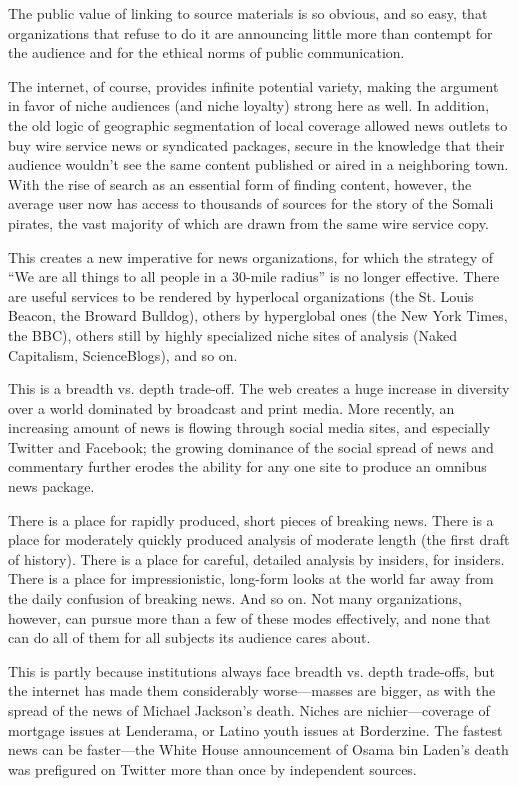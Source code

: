 The public value of linking to source materials is so obvious, and
so easy, that organizations that refuse to do it are announcing little
more than contempt for the audience and for the ethical norms of
public communication.

The internet, of course, provides infinite potential variety, making the argument
in favor of niche audiences (and niche loyalty) strong here as well. In addition,
the old logic of geographic segmentation of local coverage allowed news outlets to buy wire service news or syndicated packages, secure in the knowledge that
their audience wouldn’t see the same content published or aired in a neighboring
town. With the rise of search as an essential form of finding content, however, the
average user now has access to thousands of sources for the story of the Somali
pirates, the vast majority of which are drawn from the same wire service copy.

This creates a new imperative for news organizations, for which the strategy of
``We are all things to all people in a 30-mile radius'' is no longer effective. There
are useful services to be rendered by hyperlocal organizations (the St. Louis Beacon,
the Broward Bulldog), others by hyperglobal ones (the New York Times, the
BBC), others still by highly specialized niche sites of analysis (Naked Capitalism,
ScienceBlogs), and so on.

This is a breadth vs. depth trade-off. The web creates a huge increase in diversity
over a world dominated by broadcast and print media. More recently, an increasing
amount of news is flowing through social media sites, and especially Twitter
and Facebook; the growing dominance of the social spread of news and commentary
further erodes the ability for any one site to produce an omnibus news
package.

There is a place for rapidly produced, short pieces of breaking news. There is a
place for moderately quickly produced analysis of moderate length (the first draft
of history). There is a place for careful, detailed analysis by insiders, for insiders.
There is a place for impressionistic, long-form looks at the world far away from
the daily confusion of breaking news. And so on. Not many organizations, however,
can pursue more than a few of these modes effectively, and none that can
do all of them for all subjects its audience cares about.

This is partly because institutions always face breadth vs. depth trade-offs, but
the internet has made them considerably worse—masses are bigger, as with the
spread of the news of Michael Jackson’s death. Niches are nichier—coverage of
mortgage issues at Lenderama, or Latino youth issues at Borderzine. The fastest
news can be faster—the White House announcement of Osama bin Laden’s
death was prefigured on Twitter more than once by independent sources.


